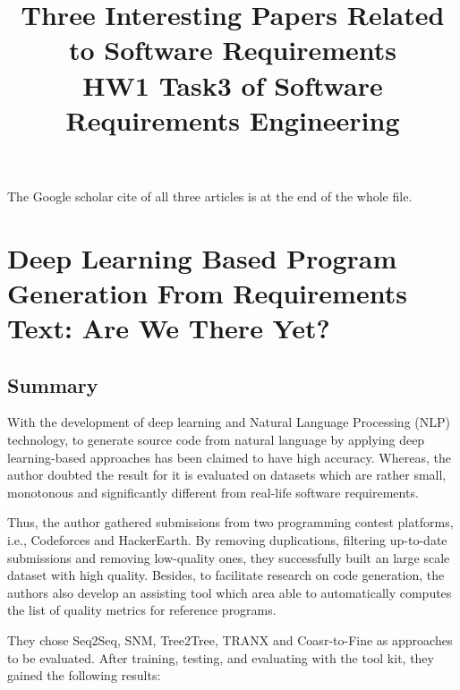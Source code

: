 \documentclass[10pt,conference]{IEEEtran}
\begin{document}
\title{Three Interesting Papers Related to Software Requirements\\
{\footnotesize \textsuperscript{} HW1 Task3 of Software Requirements Engineering}
}

\author{
}
\maketitle

The Google scholar cite of all three articles is at the end of the whole file.

\section{Deep Learning Based Program Generation From Requirements Text: Are We There Yet?\cite{liu2020deep}}

\subsection{Summary}
With the development of deep learning and Natural Language Processing  (NLP) technology, to generate source code from natural language by applying deep learning-based approaches has been claimed to have high accuracy. Whereas, the author doubted the result for it is evaluated on datasets which are rather small,  monotonous and significantly different from real-life software requirements.

Thus, the author gathered submissions from two programming contest platforms, i.e., Codeforces and HackerEarth. By removing duplications, filtering up-to-date submissions and removing low-quality ones, they successfully built an large scale dataset with  high quality. Besides, to facilitate research on code generation, the authors also develop an assisting tool which area able to automatically computes the list of quality metrics for reference programs.

They chose Seq2Seq, SNM, Tree2Tree, TRANX and Coasr-to-Fine as approaches to be evaluated. After training, testing, and evaluating with the tool kit, they gained the following results:
\end{document}
